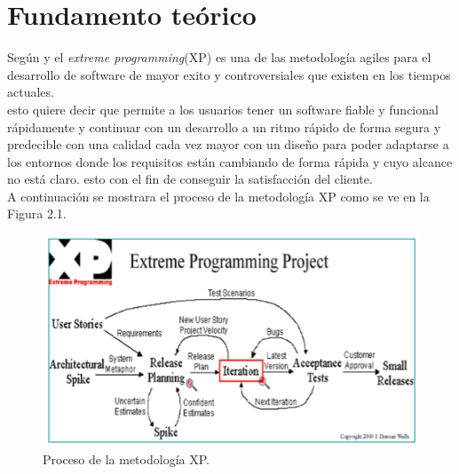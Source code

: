 \documentclass[letterpaper,oneside,openany,11pt]{book}
\begin{document}



\chapter{Fundamento  teórico}\label{cap.marco}

\noindent  Según \cite{Thiyagarajan} y \cite{Com} el \textit{extreme programming}(XP) es una de las metodología agiles para el desarrollo de software de mayor exito y controversiales que existen en los tiempos actuales. \\

esto quiere decir que permite a los usuarios tener un software fiable y funcional rápidamente y continuar con un desarrollo a un ritmo rápido de forma segura y predecible con una calidad cada vez mayor con un diseño para poder adaptarse a los entornos donde los requisitos están cambiando de forma rápida y cuyo alcance no está claro. esto con el fin de conseguir la satisfacción del cliente. \\

A continuación se mostrara el proceso de la metodología XP como se ve en la Figura 2.1.\\

\begin{figure}[H]
	\centering
	\includegraphics[width=1.0\textwidth]{./Imagenes/1}
	\caption{Proceso de la metodología XP.}
\end{figure}
\end{document}
